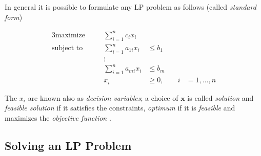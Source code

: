 %
In general it is possible to formulate any \acrshort{LP} problem as follows (called \emph{standard form}) \cite{Vanderbei2008}

\begin{alignat}{3}
	\label{eq:standard-form}
	\text{maximize}   &       & \sum_{i=1}^{n} c_{i}x_{i}                                          \\
	\text{subject to} & \quad & \sum_{i=1}^{n} a_{1i}  x_{i} & \leq b_{1} &                        \\
	                  &       & \vdots                                                             \\
	                  &       & \sum_{i=1}^{n} a_{mi}  x_{i} & \leq b_{m} &                        \\
	                  &       & x_{i}                        & \geq 0,    & \quad i & =1 ,\dots, n
\end{alignat}


The $x_i$ are known also as \emph{decision variables}; a choice of $ \mathbf{x}
$ is called \emph{solution} and \emph{feasible solution} if it satisfies the
constraints, \emph{optimum} if it is \emph{feasible} and maximizes the \emph{objective function}
\cite{Vanderbei2008}.

\subsection{Solving an LP Problem}%
\label{sub:solving_an_lp_problem}

